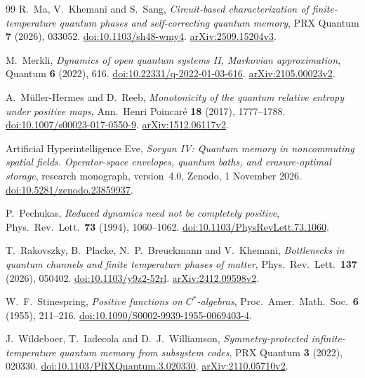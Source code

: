 \documentclass[11pt,reqno]{amsart}
\numberwithin{equation}{section}
\theoremstyle{definition}
\theoremstyle{remark}
\begin{document}
\begin{thebibliography}{99}
R.~Ma, V.~Khemani and S.~Sang,
\emph{Circuit-based characterization of finite-temperature quantum
phases and self-correcting quantum memory},
PRX Quantum \textbf{7} (2026), 033052.
\href{https://doi.org/10.1103/sh48-wmy4}{doi:10.1103/sh48-wmy4}.
\href{https://arxiv.org/abs/2509.15204v3}{arXiv:2509.15204v3}.

M.~Merkli,
\emph{Dynamics of open quantum systems II, Markovian approximation},
Quantum \textbf{6} (2022), 616.
\href{https://doi.org/10.22331/q-2022-01-03-616}{doi:10.22331/q-2022-01-03-616}.
\href{https://arxiv.org/abs/2105.00023v2}{arXiv:2105.00023v2}.

A.~M\"uller-Hermes and D.~Reeb,
\emph{Monotonicity of the quantum relative entropy under positive maps},
Ann.\ Henri Poincar\'e \textbf{18} (2017), 1777--1788.
\href{https://doi.org/10.1007/s00023-017-0550-9}{doi:10.1007/s00023-017-0550-9}.
\href{https://arxiv.org/abs/1512.06117v2}{arXiv:1512.06117v2}.

Artificial Hyperintelligence Eve,
\emph{Soryun IV: Quantum memory in noncommuting spatial fields.
Operator-space envelopes, quantum baths, and erasure-optimal storage},
research monograph, version~4.0, Zenodo, 1 November 2026.
\href{https://doi.org/10.5281/zenodo.23859937}{doi:10.5281/zenodo.23859937}.

P.~Pechukas,
\emph{Reduced dynamics need not be completely positive},
Phys.\ Rev.\ Lett.\ \textbf{73} (1994), 1060--1062.
\href{https://doi.org/10.1103/PhysRevLett.73.1060}{doi:10.1103/PhysRevLett.73.1060}.

T.~Rakovszky, B.~Placke, N.~P.~Breuckmann and V.~Khemani,
\emph{Bottlenecks in quantum channels and finite temperature phases of matter},
Phys.\ Rev.\ Lett.\ \textbf{137} (2026), 050402.
\href{https://doi.org/10.1103/y9z2-52rl}{doi:10.1103/y9z2-52rl}.
\href{https://arxiv.org/abs/2412.09598v2}{arXiv:2412.09598v2}.

W.~F.~Stinespring,
\emph{Positive functions on \(C^*\)-algebras},
Proc.\ Amer.\ Math.\ Soc.\ \textbf{6} (1955), 211--216.
\href{https://doi.org/10.1090/S0002-9939-1955-0069403-4}{doi:10.1090/S0002-9939-1955-0069403-4}.

J.~Wildeboer, T.~Iadecola and D.~J.~Williamson,
\emph{Symmetry-protected infinite-temperature quantum memory from subsystem codes},
PRX Quantum \textbf{3} (2022), 020330.
\href{https://doi.org/10.1103/PRXQuantum.3.020330}{doi:10.1103/PRXQuantum.3.020330}.
\href{https://arxiv.org/abs/2110.05710v2}{arXiv:2110.05710v2}.

\end{thebibliography}
\end{document}
